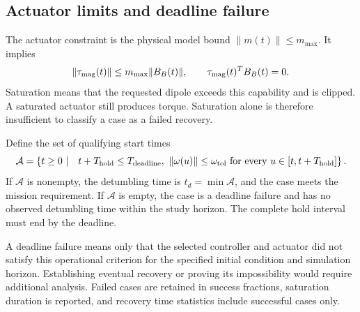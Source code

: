 \subsection{Actuator limits and deadline failure}
The actuator constraint is the physical model bound \(\|m(t)\|\leq m_{\max}\). It implies
\[
\|\tau_{\rm mag}(t)\|\leq m_{\max}\|B_B(t)\|,
\qquad
\tau_{\rm mag}(t)^TB_B(t)=0.
\]
Saturation means that the requested dipole exceeds this capability and is clipped. A saturated actuator still produces torque. Saturation alone is therefore insufficient to classify a case as a failed recovery.

Define the set of qualifying start times
\[
\mathcal A=
\left\{
t\geq0\ \middle|\quad
t+T_{\rm hold}\leq T_{\rm deadline},\
\|\omega(u)\|\leq\omega_{\rm tol}
\text{ for every }u\in[t,t+T_{\rm hold}]
\right\}.
\]
If \(\mathcal A\) is nonempty, the detumbling time is \(t_d=\min\mathcal A\), and the case meets the mission requirement. If \(\mathcal A\) is empty, the case is a deadline failure and has no observed detumbling time within the study horizon. The complete hold interval must end by the deadline.

A deadline failure means only that the selected controller and actuator did not satisfy this operational criterion for the specified initial condition and simulation horizon. Establishing eventual recovery or proving its impossibility would require additional analysis. Failed cases are retained in success fractions, saturation duration is reported, and recovery time statistics include successful cases only.
